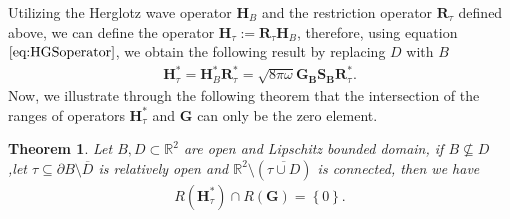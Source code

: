 \documentclass[11pt,reqno,twoside]{amsart}
\newtheorem{thm}{Theorem}[section]
\theoremstyle{definition}
\theoremstyle{remark}
\numberwithin{equation}{section}
\begin{document}
	Utilizing the  Herglotz wave operator $\mathbf H_B$ and the restriction operator $\mathbf R_{\tau}$ defined above, we can define the operator $\mathbf H_{\tau}:= \mathbf R_{\tau} \mathbf H_B$, therefore, using equation $\eqref{eq:HGSoperator}$, we obtain the following result by replacing $D$ with $B$
	\begin{align}\label{eq:RestriH}
		\mathbf H^*_{\tau}=\mathbf H^*_B \mathbf R^*_{\tau}=\sqrt{8\pi\omega}\mathbf{G_B S_B}  \mathbf R^*_{\tau}.
	\end{align}
	Now, we illustrate through the following theorem that the intersection of the ranges of operators $\mathbf H^*_{\tau}$ and $\mathbf G$ can only be the zero element.
	\begin{thm}\label{RangeHG}
		Let $B, D \subset \mathbb R^2$ are open and Lipschitz bounded domain, if $B \nsubseteq D$ ,let $\tau \subseteq \partial B \setminus \overline{D} $ is relatively open and $\mathbb R^2 \setminus \left( \overline{\tau \cup D }\right) $ is connected, then we have
			\begin{align}
				R\left( \mathbf H^*_{\tau} \right) \cap R\left( \mathbf G\right) =\left\lbrace 0\right\rbrace .
			\end{align}
	\end{thm}
	
\end{document}
